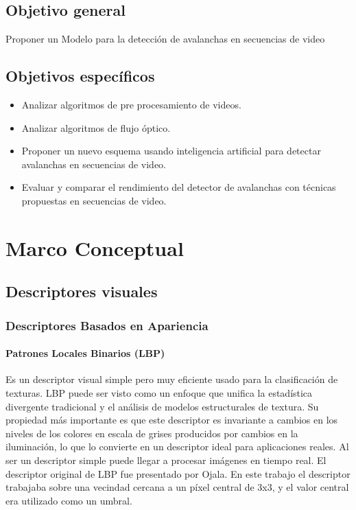 \documentclass[a4paper,11pt]{report}
\begin{document}
\section{Objetivo general}
Proponer un Modelo para la detección de avalanchas en secuencias de video


\section{Objetivos específicos}
\begin{itemize}
	\item Analizar algoritmos de pre procesamiento de videos.
	
	\item Analizar algoritmos de flujo óptico.
	
	\item Proponer un nuevo esquema usando inteligencia artificial  para detectar avalanchas en secuencias de video. 
	
	\item Evaluar y comparar el rendimiento del detector de avalanchas con técnicas propuestas  en secuencias de video.
	
	
	
\end{itemize}
\chapter{Marco Conceptual}

\section{Descriptores visuales}
\subsection{Descriptores Basados en Apariencia}



\subsubsection{Patrones Locales Binarios (LBP)}
Es un descriptor visual simple pero muy eficiente usado para la clasificación de texturas. LBP puede ser visto como un enfoque que unifica la estadística divergente tradicional y el análisis de modelos estructurales de textura. Su propiedad más importante es que este descriptor es invariante a cambios en los niveles de los colores en escala de grises producidos por cambios en la iluminación, lo que lo convierte en un descriptor ideal para aplicaciones reales. Al ser un descriptor simple puede llegar a procesar imágenes en tiempo real.
El descriptor original de LBP fue presentado por Ojala. En este trabajo el descriptor trabajaba sobre una vecindad cercana a un píxel central de 3x3, y el valor central era utilizado como un umbral.
\end{document}
